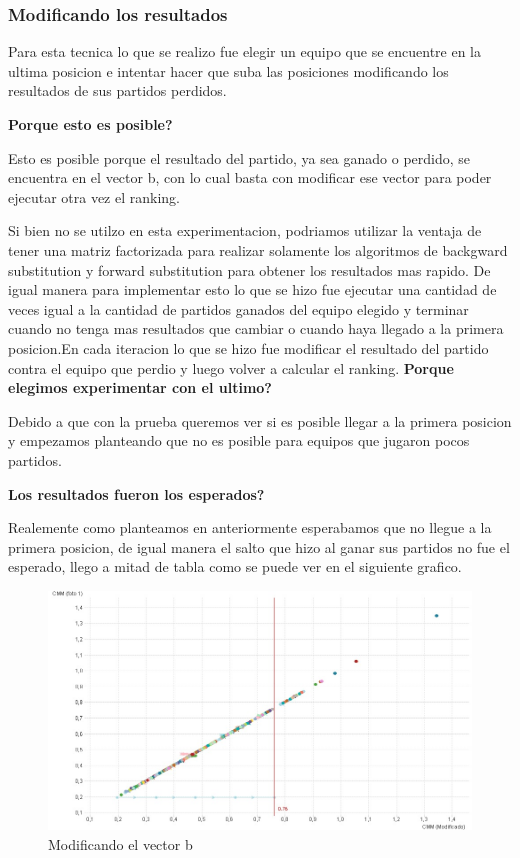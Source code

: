 \subsubsection{Modificando los resultados}

Para esta tecnica lo que se realizo fue elegir un equipo que se encuentre en la ultima posicion e intentar hacer que suba las posiciones modificando los resultados de sus partidos perdidos.

\textbf{Porque esto es posible?}

Esto es posible porque el resultado del partido, ya sea ganado o perdido, se encuentra en el vector b, con lo cual basta con modificar ese vector para poder ejecutar otra vez el ranking.

Si bien no se utilzo en esta experimentacion, podriamos utilizar la ventaja de tener una matriz factorizada para realizar solamente los algoritmos de backgward substitution y forward substitution para obtener los resultados mas rapido.
De igual manera para implementar esto lo que se hizo fue ejecutar una cantidad de veces igual a la cantidad de partidos ganados del equipo elegido y terminar cuando no tenga mas resultados que cambiar o cuando haya llegado a la primera posicion.En cada iteracion lo que se hizo fue modificar el resultado del partido contra el equipo que perdio y luego volver a calcular el ranking.
\newpage
\textbf{Porque elegimos experimentar con el ultimo?}

Debido a que con la prueba queremos ver si es posible llegar a la primera posicion y  empezamos planteando que no es posible para equipos que jugaron pocos partidos.

\textbf{Los resultados fueron los esperados?}

Realemente como planteamos en anteriormente esperabamos que no llegue a la primera posicion, de igual manera el salto que hizo al ganar sus partidos no fue el esperado, llego a mitad de tabla como se puede ver en el siguiente grafico.

\begin{figure}[H]
\centering
\includegraphics[width=1\textwidth]{IMG/modificandob.jpg}
\caption{Modificando el vector b}
\label{fig:Modificando partidos perdidos}
\end{figure}

